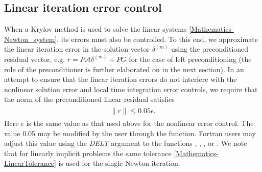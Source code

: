\documentclass[letterpaper,10pt,english]{sphinxmanual}
\begin{document}
\subsection{Linear iteration error control}
\label{Mathematics:linear-iteration-error-control}\label{Mathematics:mathematics-error-linear}
When a Krylov method is used to solve the linear systems
\eqref{Mathematics-Newton_system}, its errors must also be controlled.  To this end,
we approximate the linear iteration error in the solution vector
\(\delta^{(m)}\) using the preconditioned residual vector,
e.g. \(r = P{\mathcal A}\delta^{(m)} + PG\) for the case of left
preconditioning (the role of the preconditioner is further elaborated
on in the next section).  In an attempt to ensure that the linear
iteration errors do not interfere with the nonlinear solution error
and local time integration error controls, we require that the norm of
the preconditioned linear residual satisfies
\label{Mathematics:equation-LinearTolerance}\begin{gather}
\begin{split}\|r\| \le 0.05\epsilon.\end{split}\label{Mathematics-LinearTolerance}
\end{gather}
Here \(\epsilon\) is the same value as that used above for the
nonlinear error control.  The value 0.05 may be modified by the user
through the {\hyperref[c_interface/User_callable:c.ARKSpilsSetEpsLin]{\emph{}}} function.  Fortran users may
adjust this value using the \emph{DELT} argument to the functions
{\hyperref[f_interface/Usage:f/_/FARKSPGMR]{\emph{}}}, {\hyperref[f_interface/Usage:f/_/FARKSPBCG]{\emph{}}}, {\hyperref[f_interface/Usage:f/_/FARKSPTFQMR]{\emph{}}},
{\hyperref[f_interface/Usage:f/_/FARKSPFGMR]{\emph{}}} or {\hyperref[f_interface/Usage:f/_/FARKPCG]{\emph{}}}.  We note that for
linearly implicit problems the same tolerance \eqref{Mathematics-LinearTolerance}
is used for the single Newton iteration.
\end{document}
